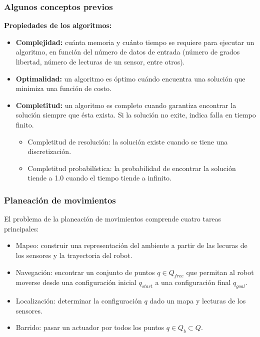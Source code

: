 \begin{frame}\frametitle{Algunos conceptos previos}
  \textbf{Propiedades de los algoritmos:}
  \begin{itemize}
  \item \textbf{Complejidad:} cuánta memoria y cuánto tiempo se requiere para ejecutar un algoritmo, en función del número de datos de entrada (número de grados libertad, número de lecturas de un sensor, entre otros).
  \item \textbf{Optimalidad:} un algoritmo es óptimo cuándo encuentra una solución que minimiza una función de costo.
  \item \textbf{Completitud:} un algoritmo es completo cuando garantiza encontrar la solución siempre que ésta exista. Si la solución no exite, indica falla en tiempo finito.
    \begin{itemize}
    \item Completitud de resolución: la solución existe cuando se tiene una discretización. 
    \item Completitud probabilística: la probabilidad de encontrar la solución tiende a 1.0 cuando el tiempo tiende a infinito.
    \end{itemize}
  \end{itemize}
\end{frame}

\begin{frame}\frametitle{Planeación de movimientos}
El problema de la planeación de movimientos comprende cuatro tareas principales:
  \begin{itemize}
  \item Mapeo: construir una representación del ambiente a partir de las lecuras de los sensores y la trayectoria del robot.
  \item Navegación: encontrar un conjunto de puntos $q \in Q_{free}$ que permitan al robot moverse desde una configuración inicial $q_{start}$ a una configuración final $q_{goal}$.     
  \item Localización: determinar la configuración $q$ dado un mapa y lecturas de los sensores. 
  \item Barrido: pasar un actuador por todos los puntos $q\in Q_b \subset Q$.
  \end{itemize}
\end{frame}

